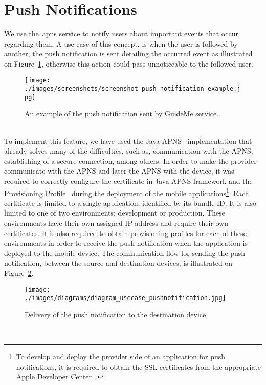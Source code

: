 \section{Push Notifications}
\label{subsec:pushNotificationIntro}
We use the~\gls{apns} service to notify users about important events that occur regarding them. A use case of this concept, is when the user is followed by another, the push notification is sent detailing the occurred event as illustrated on Figure~\ref{fig:pushNotificationExamle}, otherwise this action could pass unnoticeable to the followed user.\\
\begin{figure}[h!]
 \centering
   \texttt{[image: ./images/screenshots/screenshot\_push\_notification\_example.jpg]}
   \caption{An example of the push notification sent by GuideMe service.}
   \label{fig:pushNotificationExamle}
\end{figure}\\
To implement this feature, we have used the Java-APNS~\cite{javaApns} implementation that already solves many of the difficulties, such as, communication with the APNS, establishing of a secure connection, among others. In order to make the provider communicate with the APNS and later the APNS with the device, it was required to correctly configure the certificate in Java-APNS framework and the Provisioning Profile~\cite{appleRemoteNotifProvisioning} during the deployment of the mobile applications\footnote{To develop and deploy the provider side of an application for push notifications, it is required  to obtain the SSL certificates from the appropriate Apple Developer Center~\cite{appleIosDeveCenter}.}. Each certificate is limited to a single application, identified by its bundle ID. It is also limited to one of two environments: development or production. These environments have their own assigned IP address and require their own certificates. It is also required to obtain provisioning profiles for each of these environments in order to receive the push notification when the application is deployed to the mobile device. The communication flow for sending the push notification, between the source and destination devices, is illustrated on Figure~\ref{fig:apnsUseCase}.\\
\begin{figure}[h!]
 \centering
   \texttt{[image: ./images/diagrams/diagram\_usecase\_pushnotification.jpg]}
   \caption{Delivery of the push notification to the destination device.}
   \label{fig:apnsUseCase}
\end{figure}\\
